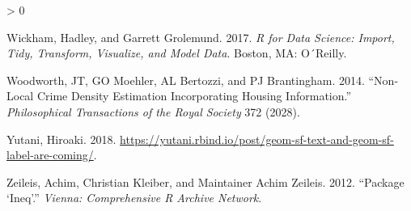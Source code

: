 \documentclass[
  krantz2]{krantz}
\newlength{\cslhangindent}
\newenvironment{CSLReferences}[2] %
 {%
  \setlength{\parindent}{0pt}
  \ifodd #1 \everypar{\setlength{\hangindent}{\cslhangindent}}\ignorespaces\fi
  \ifnum #2 > 0
  \setlength{\parskip}{#2\baselineskip}
  \fi
 }%
 {}
\begin{document}
\begin{CSLReferences}{1}{0}
\leavevmode\hypertarget{ref-Wickham_2017}{}%
Wickham, Hadley, and Garrett Grolemund. 2017. \emph{R for Data Science: Import, Tidy, Transform, Visualize, and Model Data}. Boston, MA: O´Reilly.

\leavevmode\hypertarget{ref-Woodworth_2014}{}%
Woodworth, JT, GO Moehler, AL Bertozzi, and PJ Brantingham. 2014. {``Non-Local Crime Density Estimation Incorporating Housing Information.''} \emph{Philosophical Transactions of the Royal Society} 372 (2028).

\leavevmode\hypertarget{ref-Yutani_2018}{}%
Yutani, Hiroaki. 2018. \url{https://yutani.rbind.io/post/geom-sf-text-and-geom-sf-label-are-coming/}.

\leavevmode\hypertarget{ref-zeileis2012package}{}%
Zeileis, Achim, Christian Kleiber, and Maintainer Achim Zeileis. 2012. {``Package {`Ineq'}.''} \emph{Vienna: Comprehensive R Archive Network}.

\end{CSLReferences}

\backmatter
\printindex
\end{document}
